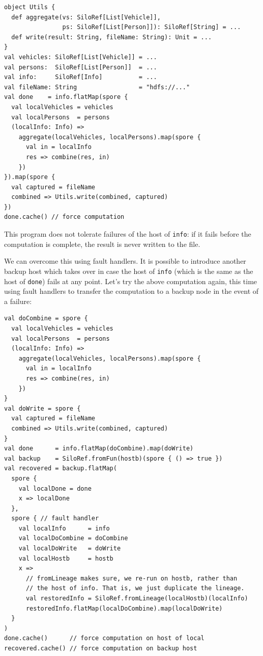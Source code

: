 \documentclass{jfp1}
\begin{document}
\vspace{-0.8mm}
\begin{lstlisting}
object Utils {
  def aggregate(vs: SiloRef[List[Vehicle]],
                ps: SiloRef[List[Person]]): SiloRef[String] = ...
  def write(result: String, fileName: String): Unit = ...
}
val vehicles: SiloRef[List[Vehicle]] = ...
val persons:  SiloRef[List[Person]]  = ...
val info:     SiloRef[Info]          = ...
val fileName: String                 = "hdfs://..."
val done    = info.flatMap(spore {
  val localVehicles = vehicles
  val localPersons  = persons
  (localInfo: Info) =>
    aggregate(localVehicles, localPersons).map(spore {
      val in = localInfo
      res => combine(res, in)
    })
}).map(spore {
  val captured = fileName
  combined => Utils.write(combined, captured)
})
done.cache() // force computation
\end{lstlisting}
\noindent
This program does not tolerate failures of the host of \verb|info|: if
it fails before the computation is complete, the result is never
written to the file.

We can overcome this using fault handlers. It is possible to introduce
another backup host which takes over in case the host of \verb|info|
(which is the same as the host of \verb|done|) fails at any
point. Let's try the above computation again, this time using fault
handlers to transfer the computation to a backup node in the event of
a failure:

\begin{lstlisting}
val doCombine = spore {
  val localVehicles = vehicles
  val localPersons  = persons
  (localInfo: Info) =>
    aggregate(localVehicles, localPersons).map(spore {
      val in = localInfo
      res => combine(res, in)
    })
}
val doWrite = spore {
  val captured = fileName
  combined => Utils.write(combined, captured)
}
val done      = info.flatMap(doCombine).map(doWrite)
val backup    = SiloRef.fromFun(hostb)(spore { () => true })
val recovered = backup.flatMap(
  spore {
    val localDone = done
    x => localDone
  },
  spore { // fault handler
    val localInfo      = info
    val localDoCombine = doCombine
    val localDoWrite   = doWrite
    val localHostb     = hostb
    x =>
      // fromLineage makes sure, we re-run on hostb, rather than
      // the host of info. That is, we just duplicate the lineage.
      val restoredInfo = SiloRef.fromLineage(localHostb)(localInfo)
      restoredInfo.flatMap(localDoCombine).map(localDoWrite)
  }
)
done.cache()      // force computation on host of local
recovered.cache() // force computation on backup host
\end{lstlisting}
\noindent
\end{document}
